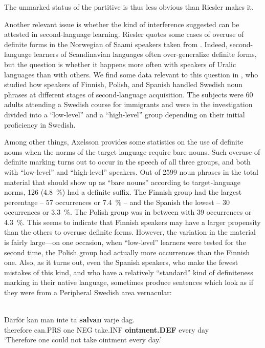 \z

The unmarked status of the partitive is thus less obvious than Riesler makes it. 

Another relevant issue is whether the kind of interference suggested can be attested in second-language learning. Riesler quotes some cases of overuse of definite forms in the Norwegian of Saami speakers taken from \citet{Bull1995}. Indeed, second-language learners of Scandinavian languages often over-generalize definite forms, but the question is whether it happens more often with speakers of Uralic languages than with others. We find some data relevant to this question in \citet{Axelsson1994}, who studied how speakers of Finnish, Polish, and Spanish handled Swedish noun phrases at different stages of second-language acquisition. The subjects were 60 adults attending a Swedish course for immigrants and were in the investigation divided into a “low-level” and a “high-level” group depending on their initial proficiency in Swedish.

Among other things, Axelsson provides some statistics on the use of definite nouns when the norms of the target language require bare nouns. Such overuse of definite marking turns out to occur in the speech of all three groups, and both with “low-level” and “high-level” speakers. Out of 2599 noun phrases in the total material that should show up as “bare nouns” according to target-language norms, 126 (4.8~\%) had a definite suffix. The Finnish group had the largest percentage – 57 occurrences or 7.4~\% – and the Spanish the lowest – 30 occurrences or 3.3~\%. The Polish group was in between with 39 occurrences or 4.3~\%. This seems to indicate that Finnish speakers may have a larger propensity than the others to overuse definite forms. However, the variation in the material is fairly large—on one occasion, when “low-level” learners were tested for the second time, the Polish group had actually more occurrences  than the Finnish one. Also, as it turns out, even the Spanish speakers, who make the fewest mistakes of this kind, and who have a relatively “standard” kind of definiteness marking in their native language, sometimes produce sentences which look as if they were from a Peripheral Swedish area vernacular:

\ea\label{}
\\
\gll Därför  kan  man  inte  ta  \textbf{salvan} varje  dag.  \\
therefore  can.PRS  one  NEG  take.INF  \textbf{ointment.DEF} every  day  \\
\glt ‘Therefore one could not take ointment every day.’

